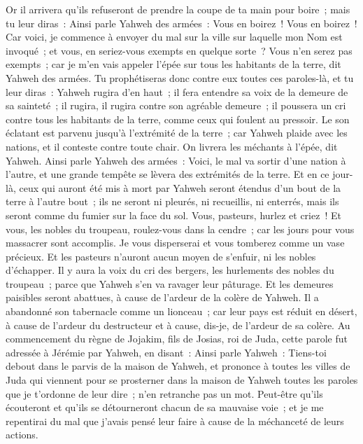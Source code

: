 \begin{multicols}{2}
Or il arrivera qu'ils refuseront de prendre la coupe de ta main pour boire~; mais tu leur diras~: Ainsi parle Yahweh des armées~: Vous en boirez~! Vous en boirez~!
Car voici, je commence à envoyer du mal sur la ville sur laquelle mon Nom est invoqué~; et vous, en seriez-vous exempts en quelque sorte~? Vous n'en serez pas exempts~; car je m'en vais appeler l'épée sur tous les habitants de la terre, dit Yahweh des armées.
Tu prophétiseras donc contre eux toutes ces paroles-là, et tu leur diras~: Yahweh rugira d'en haut~; il fera entendre sa voix de la demeure de sa sainteté~; il rugira, il rugira contre son agréable demeure~; il poussera un cri contre tous les habitants de la terre, comme ceux qui foulent au pressoir.
Le son éclatant est parvenu jusqu'à l'extrémité de la terre~; car Yahweh plaide avec les nations, et il conteste contre toute chair. On livrera les méchants à l'épée, dit Yahweh.
Ainsi parle Yahweh des armées~: Voici, le mal va sortir d'une nation à l'autre, et une grande tempête se lèvera des extrémités de la terre.
Et en ce jour-là, ceux qui auront été mis à mort par Yahweh seront étendus d'un bout de la terre à l'autre bout~; ils ne seront ni pleurés, ni recueillis, ni enterrés, mais ils seront comme du fumier sur la face du sol.
Vous, pasteurs, hurlez et criez~! Et vous, les nobles du troupeau, roulez-vous dans la cendre~; car les jours pour vous massacrer sont accomplis. Je vous disperserai et vous tomberez comme un vase précieux.
Et les pasteurs n'auront aucun moyen de s'enfuir, ni les nobles d'échapper. 
Il y aura la voix du cri des bergers, les hurlements des nobles du troupeau~; parce que Yahweh s'en va ravager leur pâturage.
Et les demeures paisibles seront abattues, à cause de l'ardeur de la colère de Yahweh.
Il a abandonné son tabernacle comme un lionceau~; car leur pays est réduit en désert, à cause de l'ardeur du destructeur et à cause, dis-je, de l'ardeur de sa colère.
\VerseOne{}Au commencement du règne de Jojakim, fils de Josias, roi de Juda, cette parole fut adressée à Jérémie par Yahweh, en disant~:
Ainsi parle Yahweh~: Tiens-toi debout dans le parvis de la maison de Yahweh, et prononce à toutes les villes de Juda qui viennent pour se prosterner dans la maison de Yahweh toutes les paroles que je t'ordonne de leur dire~; n'en retranche pas un mot.
Peut-être qu'ils écouteront et qu'ils se détourneront chacun de sa mauvaise voie~; et je me repentirai du mal que j'avais pensé leur faire à cause de la méchanceté de leurs actions.

\end{multicols}
